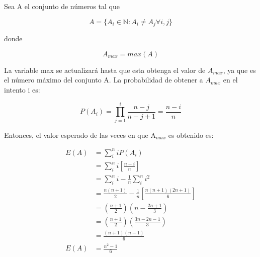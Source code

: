 Sea A el conjunto de números tal que

\begin{equation*}
    A=\{ A_i \in \mathbb{N} : A_i \neq A_j \forall i,j\}
\end{equation*}

donde

\begin{equation*}
    A_{max} = max(A)
\end{equation*}

La variable max se actualizará hasta que esta obtenga el valor de $A_{max}$, ya que es el número máximo del conjunto A. La probabilidad de obtener a $A_{max}$ en el intento i es:

\begin{equation*}
    P(A_i) = \prod_{j=1}^i \frac{n-j}{n-j+1} = \frac{n-i}{n}
\end{equation*}

Entonces, el valor esperado de las veces en que A$_{max}$ es obtenido es:

\begin{align*}
    E(A) & = \sum_i^n i P(A_i)                                                  \\
         & = \sum_i^n i \left[\frac{n-i}{n}\right]                              \\
         & = \sum_i^n i - \frac{1}{n} \sum_i^n i^2                              \\
         & = \frac{n(n+1)}{2} - \frac{1}{n} \left[\frac{n(n+1)(2n+1)}{6}\right] \\
         & = \left(\frac{n+1}{2}\right) \left(n - \frac{2n+1}{3} \right)        \\
         & = \left( \frac{n+1}{2} \right) \left(\frac{3n-2n-1}{3} \right)       \\
         & = \frac{(n+1)(n-1)}{6}                                               \\
    E(A) & = \frac{n^2-1}{6}
\end{align*}